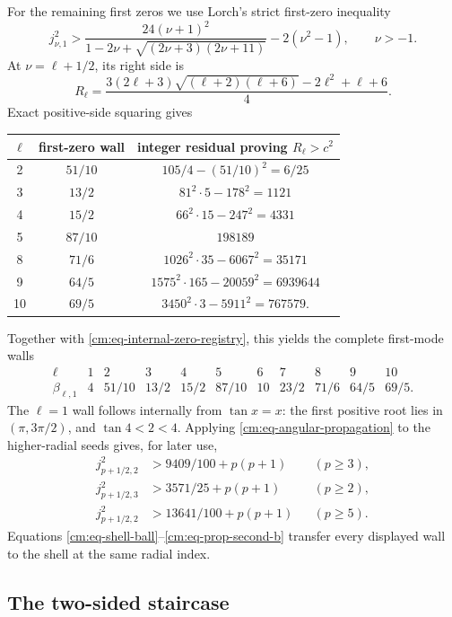 \documentclass[11pt]{article}
\numberwithin{equation}{section}
\theoremstyle{definition}
\theoremstyle{remark}
\begin{document}
For the remaining first zeros we use Lorch's strict first-zero inequality
\cite{Lorch1993}
\[
 j_{\nu,1}^2>
 \frac{24(\nu+1)^2}
 {1-2\nu+\sqrt{(2\nu+3)(2\nu+11)}}-2(\nu^2-1),
 \qquad \nu>-1.
\]
At \(\nu=\ell+1/2\), its right side is
\[
 R_\ell=\frac{3(2\ell+3)\sqrt{(\ell+2)(\ell+6)}
 -2\ell^2+\ell+6}{4}.
\]
Exact positive-side squaring gives
\begin{center}
\small
\begin{tabular}{c|c|c}
\(\ell\)&first-zero wall&integer residual proving \(R_\ell>c^2\)\\ \hline
2&\(51/10\)&\(105/4-(51/10)^2=6/25\)\\
3&\(13/2\)&\(81^2\cdot5-178^2=1121\)\\
4&\(15/2\)&\(66^2\cdot15-247^2=4331\)\\
5&\(87/10\)&\(198189\)\\
8&\(71/6\)&\(1026^2\cdot35-6067^2=35171\)\\
9&\(64/5\)&\(1575^2\cdot165-20059^2=6939644\)\\
10&\(69/5\)&\(3450^2\cdot3-5911^2=767579\).
\end{tabular}
\end{center}
Together with \eqref{cm:eq-internal-zero-registry}, this yields the complete
first-mode walls
\begin{equation}
\begin{array}{c|cccccccccc}
\ell&1&2&3&4&5&6&7&8&9&10\\ \hline
\beta_{\ell,1}&4&51/10&13/2&15/2&87/10&10&23/2&71/6&64/5&69/5.
\end{array}
 \label{cm:eq-first-zero-table}
\end{equation}
The \(\ell=1\) wall follows internally from \(\tan x=x\): the first
positive root lies in \((\pi,3\pi/2)\), and \(\tan4<2<4\).
Applying \eqref{cm:eq-angular-propagation} to the higher-radial seeds gives,
for later use,
\begin{align}
 j_{p+1/2,2}^2&>9409/100+p(p+1) &&(p\geq3),\label{cm:eq-prop-second-a}\\
 j_{p+1/2,3}^2&>3571/25+p(p+1) &&(p\geq2),\label{cm:eq-prop-third}\\
 j_{p+1/2,2}^2&>13641/100+p(p+1) &&(p\geq5).
 \label{cm:eq-prop-second-b}
\end{align}
Equations \eqref{cm:eq-shell-ball}--\eqref{cm:eq-prop-second-b} transfer
every displayed wall to the shell at the same radial index.


\subsection{The two-sided staircase}
\end{document}
